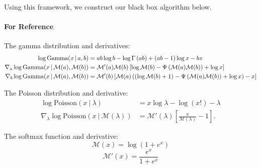 Using this framework, we construct our black box algorithm below. 

\paragraph{For Reference}
The gamma distribution and derivatives:
\begin{align}
\log\mbox{Gamma}(x \, | \, a,b) & = ab\log b - \log\Gamma \left(ab\right) +(ab-1)\log x - bx \label{eq:gamma}\\
\nabla_a \log\mbox{Gamma}(x \, | \, \mathcal{M}(a), \mathcal{M}(b)) &= 
\mathcal{M}'(a) \mathcal{M}(b) \left[ \log \mathcal{M}(b) - \Psi \left(\mathcal{M}(a)\mathcal{M}(b)\right) + \log x\right] \label{eq:dgammaA}
\\
\nabla_b \log\mbox{Gamma}(x \, | \, \mathcal{M}(a), \mathcal{M}(b)) &= 
\mathcal{M}'(b) \left[ \mathcal{M}(a) \left((\log \mathcal{M}(b) + 1) - \Psi \left(\mathcal{M}(a)\mathcal{M}(b)\right) + \log x\right) - x\right]\label{eq:dgammaB}
\end{align}

The Poisson distribution and derivative:
\begin{align}
\log\mbox{Poisson}(x~\vert~\lambda) &= x\log\lambda - \log(x!) - \lambda \label{eq:poisson} \\
\nabla_\lambda \log\mbox{Poisson}(x~\vert~\mathcal{M}(\lambda)) &= \mathcal{M}'(\lambda)\left[\frac{x}{\mathcal{M}(\lambda)} -1\right].\label{eq:dpoisson}
\end{align}

The softmax function and derivative:
\[\mathcal{M}(x) = \log(1+e^x)\]
\[\mathcal{M}'(x) = \frac{e^x}{1+e^x}\]



